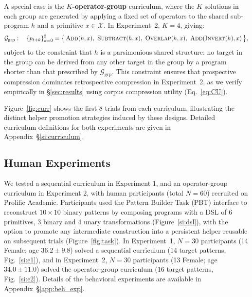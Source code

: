 \documentclass{article}
\begin{document}
A special case is the \textbf{$K$-operator-group} curriculum, where the $K$ solutions in each group are generated by applying a fixed set of operators to the shared sub-program $h$ and a primitive $x \in \mathcal{X}$. 
In Experiment~2, $K = 4$, giving:
\[
\mathcal{G}_{\mathrm{grp}}: \quad \{p_{t+k}\}_{k=0}^{3} = \bigl\{\,\textsc{Add}(h, x),\ \textsc{Subtract}(h, x),\ \textsc{Overlap}(h, x),\ \textsc{Add}(\textsc{Invert}(h), x)\,\bigr\},
\]
subject to the constraint that $h$ is a parsimonious shared structure: no target in the group can be derived from any other target in the group by a program shorter than that prescribed by $\mathcal{G}_{\mathrm{grp}}$. This constraint ensures that prospective compression dominates 
retrospective compression in Experiment~2, as we verify empirically in \S\ref{sec:results} using corpus compression utility (Eq.~\ref{eq:CU}).

Figure~\ref{fig:curr} shows the first 8 trials from each curriculum, illustrating the distinct helper promotion strategies induced by these designs. Detailed curriculum definitions for both experiments are given in Appendix~\S\ref{si:curriculum}.


\subsection{Human Experiments}

We tested a sequential curriculum in Experiment 1, and an operator-group curriculum in Experiment 2, with human participants (total $N=60$) recruited on Prolific Academic.
Participants used the Pattern Builder Task (PBT) interface to reconstruct $10\times10$ binary patterns by composing programs with a DSL of 6 primitives, 3 binary and 4 unary transformations (Figure~\ref{si:dsl}), with the option to promote any intermediate construction into a persistent helper reusable on subsequent trials (Figure~\ref{fig:task}).
In Experiment~1, $N{=}30$ participants (14 Female; age $36.2 \pm 9.8$) solved a sequential curriculum (14 target patterns, Fig.~\ref{si:e1}),
and in Experiment~2, $N{=}30$ participants (13 Female; age $34.0 \pm 11.0$) solved the operator-group curriculum (16 target patterns, Fig.~\ref{si:e2}).
Details of the behavioral experiments are available in Appendix~\S\ref{app:beh_exp}.


\end{document}
